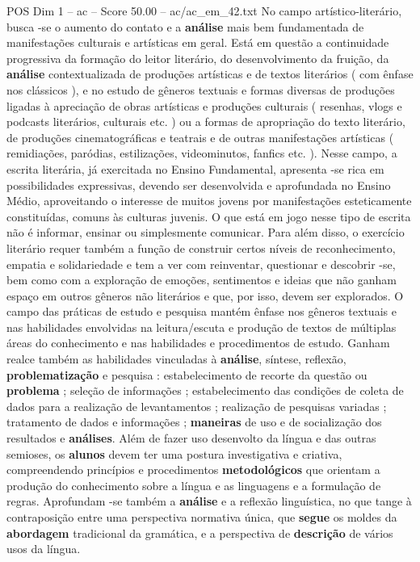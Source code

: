 \begin{textsample}{POS Dim 1 – ac – Score 50.00 – ac/ac\_em\_42.txt}
No campo artístico-literário, busca -se o aumento do contato e a \textbf{análise} mais bem fundamentada de manifestações culturais e artísticas em geral.
Está em questão a continuidade progressiva da formação do leitor literário, do desenvolvimento da fruição, da \textbf{análise} contextualizada de produções artísticas e de textos literários ( com ênfase nos clássicos ), e no estudo de gêneros textuais e formas diversas de produções ligadas à apreciação de obras artísticas e produções culturais ( resenhas, vlogs e podcasts literários, culturais etc. ) ou a formas de apropriação do texto literário, de produções cinematográficas e teatrais e de outras manifestações artísticas ( remidiações, paródias, estilizações, videominutos, fanfics etc. ).
Nesse campo, a escrita literária, já exercitada no Ensino Fundamental, apresenta -se rica em possibilidades expressivas, devendo ser desenvolvida e aprofundada no Ensino Médio, aproveitando o interesse de muitos jovens por manifestações esteticamente constituídas, comuns às culturas juvenis.
O que está em jogo nesse tipo de escrita não é informar, ensinar ou simplesmente comunicar.
Para além disso, o exercício literário requer também a função de construir certos níveis de reconhecimento, empatia e solidariedade e tem a ver com reinventar, questionar e descobrir -se, bem como com a exploração de emoções, sentimentos e ideias que não ganham espaço em outros gêneros não literários e que, por isso, devem ser explorados.
O campo das práticas de estudo e pesquisa mantém ênfase nos gêneros textuais e nas habilidades envolvidas na leitura/escuta e produção de textos de múltiplas áreas do conhecimento e nas habilidades e procedimentos de estudo.
Ganham realce também as habilidades vinculadas à \textbf{análise}, síntese, reflexão, \textbf{problematização} e pesquisa : estabelecimento de recorte da questão ou \textbf{problema} ; seleção de informações ; estabelecimento das condições de coleta de dados para a realização de levantamentos ; realização de pesquisas variadas ; tratamento de dados e informações ; \textbf{maneiras} de uso e de socialização dos resultados e \textbf{análises}.
Além de fazer uso desenvolto da língua e das outras semioses, os \textbf{alunos} devem ter uma postura investigativa e criativa, compreendendo princípios e procedimentos \textbf{metodológicos} que orientam a produção do conhecimento sobre a língua e as linguagens e a formulação de regras.
Aprofundam -se também a \textbf{análise} e a reflexão linguística, no que tange à contraposição entre uma perspectiva normativa única, que \textbf{segue} os moldes da \textbf{abordagem} tradicional da gramática, e a perspectiva de \textbf{descrição} de vários usos da língua.

\end{textsample}
